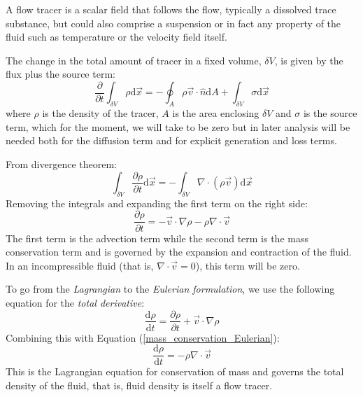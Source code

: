 \documentclass[11pt]{article}
\begin{document}
A flow tracer is a scalar field that follows the flow, typically a dissolved
trace substance, but could also comprise a suspension or in fact any property
of the fluid such as temperature or the velocity field itself.

The change in the total amount of tracer in a fixed volume, $\delta V$, is given
by the flux plus the source term:
\begin{equation}
	\frac{\partial}{\partial t}\int_{\delta V} \rho \mathrm d \vec x=-\oint_A \rho \vec v \cdot \hat n \mathrm d A
	+ \int_{\delta V} \sigma \mathrm d \vec x
\end{equation}
where $\rho$ is the density of the tracer,
$A$ is the area enclosing $\delta V$ and $\sigma$ is the source term, which for the moment,
we will take to be zero but in later analysis will 
be needed both for the diffusion term and for explicit generation and loss terms.

From divergence theorem:
\begin{equation}
	\int_{\delta V} \frac{\partial \rho}{\partial t} \mathrm d \vec x=-\int_{\delta V} \nabla \cdot (\rho \vec v)\mathrm d \vec x 
\end{equation}
Removing the integrals and expanding the first term on the right side:
\begin{equation}
\frac{\partial \rho}{\partial t} =-\vec v \cdot \nabla \rho - \rho \nabla \cdot \vec v 
\label{mass_conservation_Eulerian}
\end{equation}
The first term is the advection term while the second term is the mass
conservation term and is governed by the 
expansion and contraction of the fluid.  In an incompressible fluid (that is,
$\nabla \cdot \vec v = 0$), this term will be zero.

To go from the {\it Lagrangian} to the {\it Eulerian formulation}, 
we use the following equation for the {\it total derivative}:
\begin{equation}
\frac{\mathrm d \rho}{\mathrm d t}
 = \frac{\partial \rho}{\partial t} + \vec v \cdot \nabla \rho
\end{equation}
Combining this with Equation (\ref{mass_conservation_Eulerian}):
\begin{equation}
\frac{\mathrm d \rho}{\mathrm d t} =  - \rho \nabla \cdot \vec v
\label{mass_conservation_Lagrangian}
\end{equation}
This is the Lagrangian equation for conservation of mass and governs the total density
of the fluid, that is, fluid density is itself a flow tracer.
\end{document}

